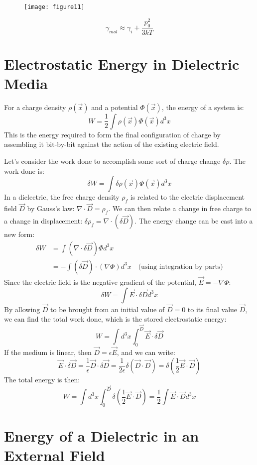 \documentclass{article}
\begin{document}
	\begin{figure}[h]
		\centering
		\texttt{[image: figure11]}
		\caption{}
		\label{fig:figure11}
	\end{figure}
	
	\[
	\gamma_{mol} \approx \gamma_i + \frac{p_0^2}{3kT}
	\]
	
	\section{Electrostatic Energy in Dielectric Media}
	
	For a charge density $\rho(\vec{x})$ and a potential $\Phi(\vec{x})$, the energy of a system is:
	\[
	W = \frac{1}{2} \int \rho(\vec{x}) \Phi(\vec{x}) d^3x
	\]
	This is the energy required to form the final configuration of charge by assembling it bit-by-bit against the action of the existing electric field.
	
	Let's consider the work done to accomplish some sort of charge change $\delta\rho$. The work done is:
	\[
	\delta W = \int \delta\rho(\vec{x}) \Phi(\vec{x}) d^3x
	\]
	In a dielectric, the free charge density $\rho_f$ is related to the electric displacement field $\vec{D}$ by Gauss's law: $\nabla \cdot \vec{D} = \rho_f$.
	We can then relate a change in free charge to a change in displacement: $\delta\rho_f = \nabla \cdot (\delta\vec{D})$. The energy change can be cast into a new form:
	\begin{align*}
		\delta W &= \int (\nabla \cdot \delta\vec{D}) \Phi d^3x \\
		&= - \int (\delta\vec{D}) \cdot (\nabla\Phi) d^3x \quad \text{(using integration by parts)}
	\end{align*}
	Since the electric field is the negative gradient of the potential, $\vec{E} = -\nabla\Phi$:
	\[
	\delta W = \int \vec{E} \cdot \delta\vec{D} d^3x
	\]
	By allowing $\vec{D}$ to be brought from an initial value of $\vec{D}=0$ to its final value $\vec{D}$, we can find the total work done, which is the stored electrostatic energy:
	\[
	W = \int d^3x \int_0^{\vec{D}} \vec{E} \cdot \delta\vec{D}
	\]
	If the medium is linear, then $\vec{D} = \epsilon \vec{E}$, and we can write:
	\[
	\vec{E} \cdot \delta\vec{D} = \frac{1}{\epsilon} \vec{D} \cdot \delta\vec{D} = \frac{1}{2\epsilon} \delta(\vec{D} \cdot \vec{D}) = \delta\left( \frac{1}{2} \vec{E} \cdot \vec{D} \right)
	\]
	The total energy is then:
	\[
	W = \int d^3x \int_0^{\vec{D}} \delta\left( \frac{1}{2} \vec{E} \cdot \vec{D} \right) = \frac{1}{2} \int \vec{E} \cdot \vec{D} d^3x
	\]
	\section{Energy of a Dielectric in an External Field}
	
\end{document}
